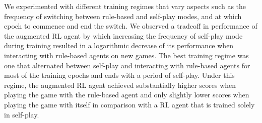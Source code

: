 \documentclass[letterpaper]{article} %
\begin{document}
We experimented with different training regimes that vary aspects such as the frequency of switching between rule-based
and self-play modes, and at which epoch to commence and end the switch.
 We observed a tradeoff in   performance  of the augmented RL agent by which increasing the frequency of self-play mode
 during training resulted in a  logarithmic decrease of  its performance when interacting with  rule-based agents  on new games.
The best training regime was one that  alternated between self-play and interacting with  rule-based agents for most of the training epochs and ends with a period of  self-play.
Under this regime, the augmented RL agent achieved substantially higher scores when playing the game with the rule-based agent and only slightly lower scores when playing the game with itself in comparison with a RL agent that is trained solely in self-play.



\end{document}

